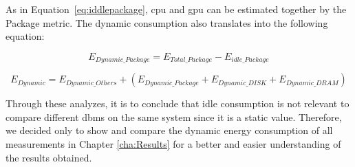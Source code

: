 As in Equation~\ref{eq:iddlepackage}, \gls{cpu} and \gls{gpu} can be estimated together by the Package metric. The dynamic consumption also translates into the following equation:

\begin{equation}
E_{Dynamic\_Package} =  E_{Total\_Package} - E_{idle\_Package}
\end{equation}$
$

\begin{equation}
\label{eq:DDYNAMICpackage}
E_{Dynamic} = E_{Dynamic\_Others} + ( E_{Dynamic\_Package} + E_{Dynamic\_DISK} + E_{Dynamic\_DRAM})
\end{equation}$
$

Through these analyzes, it is to conclude that idle consumption is not relevant to compare different \gls{dbms} on the same system since it is a static value. Therefore, we decided only to show and compare the dynamic energy consumption of all measurements in Chapter \ref{cha:Results}  for a better and easier understanding of the results obtained. 
